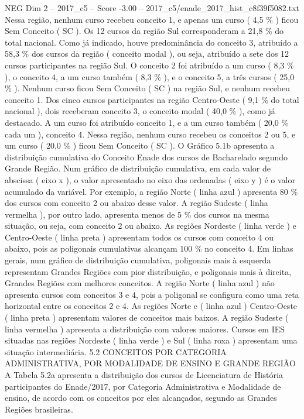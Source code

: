 \begin{textsample}{NEG Dim 2 – 2017\_c5 – Score -3.00 – 2017\_c5/enade\_2017\_hist\_c8f39f5082.txt}
Nessa região, nenhum curso recebeu conceito 1, e apenas um curso ( 4,5 \% ) ficou Sem Conceito ( SC ).
Os 12 cursos da região Sul corresponderam a 21,8 \% do total nacional.
Como já indicado, houve predominância do conceito 3, atribuído a 58,3 \% dos cursos da região ( conceito modal ), ou seja, atribuído a sete dos 12 cursos participantes na região Sul.
O conceito 2 foi atribuído a um curso ( 8,3 \% ), o conceito 4, a um curso também ( 8,3 \% ), e o conceito 5, a três cursos ( 25,0 \% ).
Nenhum curso ficou Sem Conceito ( SC ) na região Sul, e nenhum recebeu conceito 1.
Dos cinco cursos participantes na região Centro-Oeste ( 9,1 \% do total nacional ), dois receberam conceito 3, o conceito modal ( 40,0 \% ), como já destacado.
A um curso foi atribuído conceito 1, e a um curso também ( 20,0 \% cada um ), conceito 4.
Nessa região, nenhum curso recebeu os conceitos 2 ou 5, e um curso ( 20,0 \% ) ficou Sem Conceito ( SC ).
O Gráfico 5.1b apresenta a distribuição cumulativa do Conceito Enade dos cursos de Bacharelado segundo Grande Região.
Num gráfico de distribuição cumulativa, em cada valor de abscissa ( eixo x ), o valor apresentado no eixo das ordenadas ( eixo y ) é o valor acumulado da variável.
Por exemplo, a região Norte ( linha azul ) apresenta 80 \% dos cursos com conceito 2 ou abaixo desse valor.
A região Sudeste ( linha vermelha ), por outro lado, apresenta menos de 5 \% dos cursos na mesma situação, ou seja, com conceito 2 ou abaixo.
As regiões Nordeste ( linha verde ) e Centro-Oeste ( linha preta ) apresentam todos os cursos com conceito 4 ou abaixo, pois as poligonais cumulativas alcançam 100 \% no conceito 4.
Em linhas gerais, num gráfico de distribuição cumulativa, poligonais mais à esquerda representam Grandes Regiões com pior distribuição, e poligonais mais à direita, Grandes Regiões com melhores conceitos.
A região Norte ( linha azul ) não apresenta cursos com conceitos 3 e 4, pois a poligonal se configura como uma reta horizontal entre os conceitos 2 e 4.
As regiões Norte e ( linha azul ) Centro-Oeste ( linha preta ) apresentam valores de conceitos mais baixos.
A região Sudeste ( linha vermelha ) apresenta a distribuição com valores maiores.
Cursos em IES situadas nas regiões Nordeste ( linha verde ) e Sul ( linha roxa ) apresentam uma situação intermediária. 5.2 CONCEITOS POR CATEGORIA ADMINISTRATIVA, POR MODALIDADE DE ENSINO E GRANDE REGIÃO A Tabela 5.2a apresenta a distribuição dos cursos de Licenciatura de História participantes do Enade/2017, por Categoria Administrativa e Modalidade de ensino, de acordo com os conceitos por eles alcançados, segundo as Grandes Regiões brasileiras.

\end{textsample}
